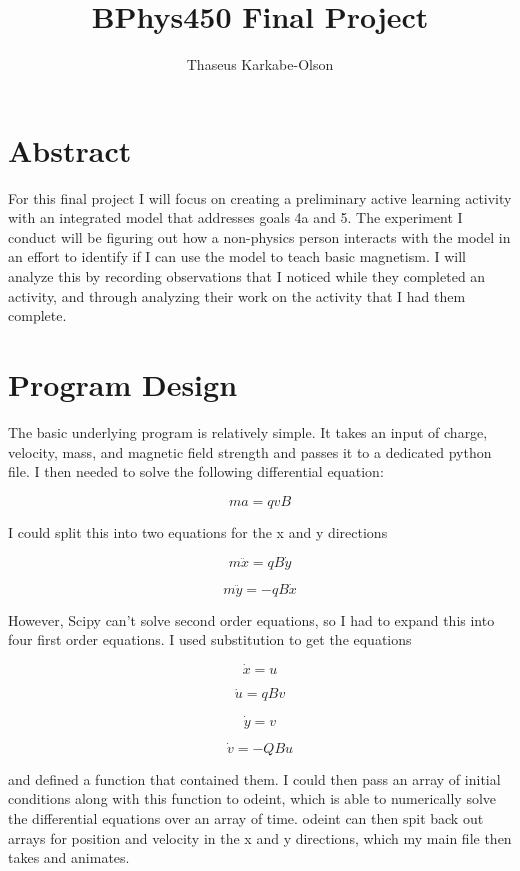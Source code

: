 \documentclass[11pt]{article}
\title{BPhys450 Final Project}
\author{Thaseus Karkabe-Olson}
\date{}
\begin{document}
	\maketitle

    \raggedright
    
    \section*{Abstract}

           	    	
        For this final project I will focus on creating a preliminary active learning activity with an integrated model that addresses goals 4a and 5. The experiment I conduct will be figuring out how a non-physics person interacts with the model in an effort to identify if I can use the model to teach basic magnetism. I will analyze this by recording observations that I noticed while they completed an activity, and through analyzing their work on the activity that I had them complete.
        
   	    \section*{Program Design}
   	    
   	    	The basic underlying program is relatively simple. It takes an input of charge, velocity, mass, and magnetic field strength and passes it to a dedicated python file. I then needed to solve the following differential equation:
   	    	
   	    	\[m a = q v B\]
   	    	
   	    	I could split this into two equations for the x and y directions
   	    	
   	    	\[m \ddot{x} = q B \dot{y}\]
   	    	
   	    	\[m \ddot{y} = - q B \dot{x}\]
   	    	
   	    	However, Scipy can't solve second order equations, so I had to expand this into four first order equations. I used substitution to get the equations
   	    	
   	    	\[\dot{x} = u\]
   	    	
   	    	\[\dot{u} = q B v\]
   	    	
   	    	\[\dot{y} = v\]
   	    	
   	    	\[\dot{v} = - Q B u\]
   	    	
   	    	and defined a function that contained them. I could then pass an array of initial conditions along with this function to odeint, which is able to numerically solve the differential equations over an array of time. odeint can then spit back out arrays for position and velocity in the x and y directions, which my main file then takes and animates.
   	    	
\end{document}
